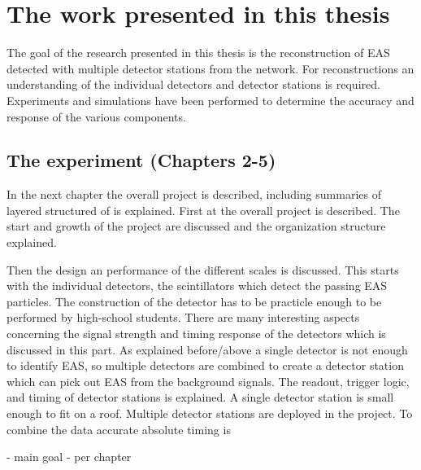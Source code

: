 \section{The work presented in this thesis}

The goal of the research presented in this thesis is the reconstruction of EAS detected with multiple detector stations from the \hisparc network. For reconstructions an understanding of the individual detectors and detector stations is required. Experiments and simulations have been performed to determine the accuracy and response of the various components.


\subsection{The \hisparc experiment (Chapters 2-5)}

In the next chapter the overall project is described, including summaries of layered structured of \hisparc is explained. First at the overall project is described. The start and growth of the project are discussed and the organization structure explained.

Then the design an performance of the different scales is discussed. This starts with the individual detectors, the scintillators which detect the passing EAS particles. The construction of the detector has to be practicle enough to be performed by high-school students. There are many interesting aspects concerning the signal strength and timing response of the detectors which is discussed in this part. As explained before/above a single detector is not enough to identify EAS, so multiple detectors are combined to create a detector station which can pick out EAS from the background signals. The readout, trigger logic, and timing of detector stations is explained. A single detector station is small enough to fit on a roof. Multiple detector stations are deployed in the \hisparc project. To combine the data accurate absolute timing is 

- main goal
- per chapter




















